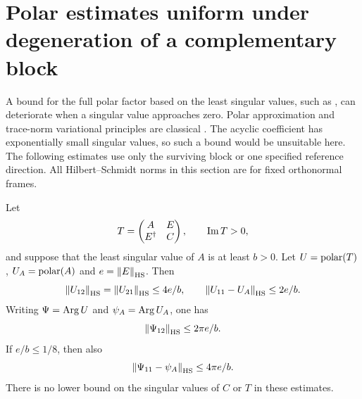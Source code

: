 \section{Polar estimates uniform under degeneration of a complementary block}\label{sec:polar}

A bound for the full polar factor based on the least singular values,
such as \cite{li95}, can deteriorate when a singular value approaches zero.
Polar approximation and trace-norm variational principles are classical
\cite{higham86,lewis95}. The acyclic coefficient has
exponentially small singular values, so such a bound would be unsuitable
here. The following estimates use only the surviving block or one
specified reference direction. All Hilbert--Schmidt norms in this
section are for fixed orthonormal frames.

\begin{lemma}\label{lem:partialpolar}
Let
\[
 T=\begin{pmatrix}A&E\\E^\dagger&C\end{pmatrix},\qquad \operatorname{Im} T>0,
\]
and suppose that the least singular value of $A$ is at least $b>0$.
Let $U=\operatorname{polar}(T)$, $U_A=\operatorname{polar}(A)$ and $e=\left\lVert E\right\rVert_{\mathrm{HS}}$.
Then
\begin{equation}\label{eq:polarblocks}
 \left\lVert U_{12}\right\rVert_{\mathrm{HS}}=\left\lVert U_{21}\right\rVert_{\mathrm{HS}}\leq4e/b,\qquad
 \left\lVert U_{11}-U_A\right\rVert_{\mathrm{HS}}\leq2e/b.
\end{equation}
Writing $\Psi=\operatorname{Arg} U$ and $\psi_A=\operatorname{Arg} U_A$, one has
\begin{equation}\label{eq:phaseoff}
 \left\lVert\Psi_{12}\right\rVert_{\mathrm{HS}}\leq2\pi e/b.
\end{equation}
If $e/b\leq1/8$, then also
\begin{equation}\label{eq:phasecompressed}
 \left\lVert\Psi_{11}-\psi_A\right\rVert_{\mathrm{HS}}\leq4\pi e/b .
\end{equation}
There is no lower bound on the singular values of $C$ or $T$ in these
estimates.
\end{lemma}

